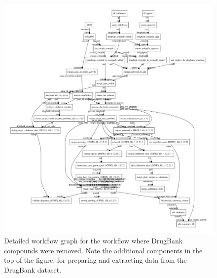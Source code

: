 \documentclass[utf8]{frontiers_suppmat} %
\begin{document}
\begin{figure}[h]
\includegraphics[width=\textwidth]{figures/workflow_graph_wo_drugbank.pdf}
    \caption{Detailed workflow graph for the workflow where DrugBank compounds
    were removed. Note the additional components in the top of the figure, for
    preparing and extracting data from the DrugBank dataset.}
    \label{fig:workflow_detailed_wo_drugbank}
\end{figure}
\end{document}
